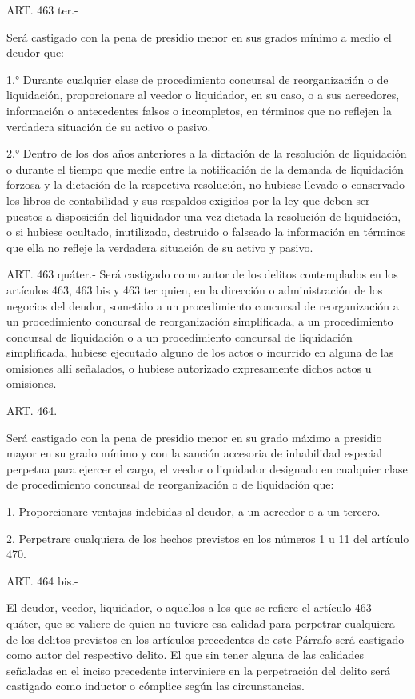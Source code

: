     ART. 463 ter.-

    Será castigado con la pena de presidio menor en sus grados mínimo a medio el deudor que:

    1.° Durante cualquier clase de procedimiento concursal de reorganización o de liquidación, proporcionare al veedor o liquidador, en su caso, o a sus acreedores, información o antecedentes falsos o incompletos, en términos que no reflejen la verdadera situación de su activo o pasivo.

    2.° Dentro de los dos años anteriores a la dictación de la resolución de liquidación o durante el tiempo que medie entre la notificación de la demanda de liquidación forzosa y la dictación de la respectiva resolución, no hubiese llevado o conservado los libros de contabilidad y sus respaldos exigidos por la ley que deben ser puestos a disposición del liquidador una vez dictada la resolución de liquidación, o si hubiese ocultado, inutilizado, destruido o falseado la información en términos que ella no refleje la verdadera situación de su activo y pasivo.

    ART. 463 quáter.-
    Será castigado como autor de los delitos contemplados en los artículos 463, 463 bis y 463 ter quien, en la dirección o administración de los negocios del deudor, sometido a un procedimiento concursal de reorganización a un procedimiento concursal de reorganización simplificada, a un procedimiento concursal de liquidación o a un procedimiento concursal de liquidación simplificada, hubiese ejecutado alguno de los actos o incurrido en alguna de las omisiones allí señalados, o hubiese autorizado expresamente dichos actos u omisiones.



    ART. 464.

    Será castigado con la pena de presidio menor en su grado máximo a presidio mayor en su grado mínimo y con la sanción accesoria de inhabilidad especial perpetua para ejercer el cargo, el veedor o liquidador designado en cualquier clase de procedimiento concursal de reorganización o de liquidación que:

    1. Proporcionare ventajas indebidas al deudor, a un acreedor o a un tercero.

    2. Perpetrare cualquiera de los hechos previstos en los números 1 u 11 del artículo 470.

    ART. 464 bis.-

    El deudor, veedor, liquidador, o aquellos a los que se refiere el artículo 463 quáter, que se valiere de quien no tuviere esa calidad para perpetrar cualquiera de los delitos previstos en los artículos precedentes de este Párrafo será castigado como autor del respectivo delito.
    El que sin tener alguna de las calidades señaladas en el inciso precedente interviniere en la perpetración del delito será castigado como inductor o cómplice según las circunstancias.

